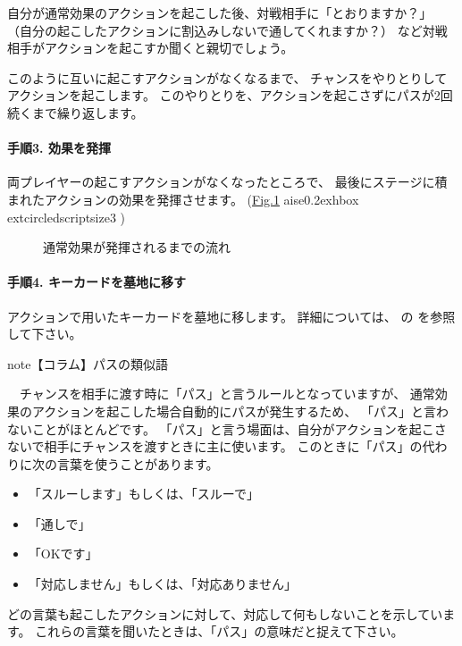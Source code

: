 \documentclass[letterpaper,10pt,dvipdfmx]{sphinxmanual}
\begin{document}
自分が通常効果のアクションを起こした後、対戦相手に「とおりますか？」
（自分の起こしたアクションに割込みしないで通してくれますか？）
など対戦相手がアクションを起こすか聞くと親切でしょう。

このように互いに起こすアクションがなくなるまで、
チャンスをやりとりしてアクションを起こします。
このやりとりを、アクションを起こさずにパスが2回続くまで繰り返します。


\paragraph{手順3. 効果を発揮}
\label{\detokenize{common/03-action:id29}}
両プレイヤーの起こすアクションがなくなったところで、
最後にステージに積まれたアクションの効果を発揮させます。
(\hyperref[\detokenize{common/03-action:action-begin}]{Fig.\@ \ref{\detokenize{common/03-action:action-begin}}} 
aise0.2exhbox{	extcircled{scriptsize{3}}} )

\begin{figure}[htbp]
\centering
\capstart

\noindent{}
\caption{通常効果が発揮されるまでの流れ}\label{\detokenize{common/03-action:id37}}\label{\detokenize{common/03-action:action-begin}}\end{figure}


\paragraph{手順4. キーカードを墓地に移す}
\label{\detokenize{common/03-action:id30}}
アクションで用いたキーカードを墓地に移します。
詳細については、
{\hyperref[\detokenize{common/03-action:action-exe}]{}} の
{\hyperref[\detokenize{common/03-action:keycard-gy}]{}}
を参照して下さい。

\begin{sphinxadmonition}{note}{【コラム】パスの類似語}

　チャンスを相手に渡す時に「パス」と言うルールとなっていますが、
通常効果のアクションを起こした場合自動的にパスが発生するため、
「パス」と言わないことがほとんどです。
「パス」と言う場面は、自分がアクションを起こさないで相手にチャンスを渡すときに主に使います。
このときに「パス」の代わりに次の言葉を使うことがあります。
\begin{itemize}
\item {} 
「スルーします」もしくは、「スルーで」

\item {} 
「通しで」

\item {} 
「OKです」

\item {} 
「対応しません」もしくは、「対応ありません」

\end{itemize}

どの言葉も起こしたアクションに対して、対応して何もしないことを示しています。
これらの言葉を聞いたときは、「パス」の意味だと捉えて下さい。
\end{sphinxadmonition}
\end{document}
